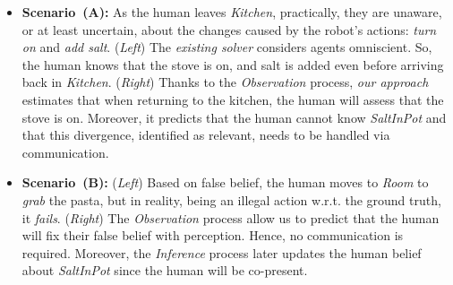\documentclass[letterpaper]{article} %
\begin{document}
\begin{itemize}
    \item \textbf{Scenario~(A):} 
    As the human leaves {\em Kitchen}, practically, they are unaware, or at least uncertain, about the changes caused by the robot's actions: {\em turn on} and {\em add salt}. (\textit{Left}) The \textit{existing solver} considers agents omniscient. So, the human knows that the stove is {\sc on}, and salt is added even before arriving back in {\em Kitchen}. (\textit{Right}) Thanks to the \textit{Observation} process, \textit{our approach} estimates that when returning to the kitchen, the human will assess that the stove is {\sc on}. Moreover, it predicts that the human cannot know \textit{SaltInPot} and that this divergence, identified as relevant, needs to be handled via communication.
    \item \textbf{Scenario~(B):}
    (\textit{Left}) Based on false belief, the human moves to \textit{Room} to \textit{grab} the pasta, but in reality, being an illegal action w.r.t. the ground truth, it \textit{fails}. 
    (\textit{Right}) 
    The \textit{Observation} process allow us to predict that the human will fix their false belief with perception. Hence, no communication is required. 
    Moreover, the \textit{Inference} process later updates the human belief about \textit{SaltInPot} since the human will be co-present.
\end{itemize} 
\end{document}

